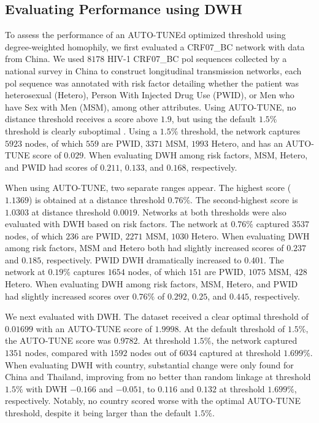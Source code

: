 \documentclass[utf8]{FrontiersinHarvard} %
\newcommand{\TODO}[1]{{\color{red}{#1}}}
\begin{document}
\subsection{Evaluating Performance using DWH}

\TODO{need to better articulate WHY we think that higher DWH is *desirable*}

To assess the performance of an AUTO-TUNEd optimized threshold using
degree-weighted homophily, we first evaluated a CRF07\_BC network with data
from China. We used $8178$ HIV-1 CRF07\_BC pol sequences collected by a national survey in China to
construct longitudinal transmission networks, each pol sequence was annotated
with risk factor detailing whether the patient was heterosexual (Hetero),
Person With Injected Drug Use (PWID), or Men who have Sex with Men (MSM), among
other attributes. Using AUTO-TUNE, no distance threshold receives a score above
$1.9$, but using the default $1.5\%$ threshold is clearly suboptimal
\label{fig:chinaScorePlot}. Using a $1.5\%$ threshold, the network captures
$5923$ nodes, of which $559$ are PWID, $3371$ MSM, $1993$ Hetero, and has
an AUTO-TUNE score of $0.029$. When evaluating DWH among risk factors, MSM,
Hetero, and PWID had scores of $0.211$, $0.133$, and $0.168$, respectively. 

When using AUTO-TUNE, two separate ranges appear. The highest score ($1.1369$) is obtained
at a distance threshold $0.76\%$. The second-highest score is
$1.0303$ at distance threshold $0.0019$. Networks at both thresholds were also
evaluated with DWH based on risk factors. The network at $0.76\%$ captured
$3537$ nodes, of which $236$ are PWID, $2271$ MSM, $1030$ Hetero. When
evaluating DWH among risk factors, MSM and Hetero both had slightly increased
scores of $0.237$ and $0.185$, respectively. PWID DWH dramatically increased to
$0.401$. The network at $0.19\%$ captures $1654$ nodes, of which $151$ are
PWID, $1075$ MSM, $428$ Hetero. When evaluating DWH among risk factors, MSM,
Hetero, and PWID had slightly increased scores over $0.76\%$ of $0.292$,
$0.25$, and $0.445$, respectively.

\TODO{The data in the above 2 paragraphs need to be in a table; the text should interpret it.
You should also mention whether or not DWH estimates were significantly different from 0}

We next evaluated \cite{rhee_national_2019} with DWH. The dataset received a
clear optimal threshold of $0.01699$ with an AUTO-TUNE score of $1.9998$. At
the default threshold of $1.5\%$, the AUTO-TUNE score was $0.9782$. At
threshold $1.5\%$, the network captured $1351$ nodes, compared with $1592$
nodes out of $6034$ captured at threshold $1.699\%$. When evaluating DWH with
country, substantial change were only found for China and Thailand, improving
from no better than random linkage at threshold $1.5\%$ with DWH $-0.166$ and
$-0.051$, to $0.116$ and $0.132$ at threshold $1.699\%$, respectively. Notably,
no country scored worse with the optimal AUTO-TUNE threshold, despite it being
larger than the default $1.5\%$. \label{fig:scoreAbove2}
\end{document}
